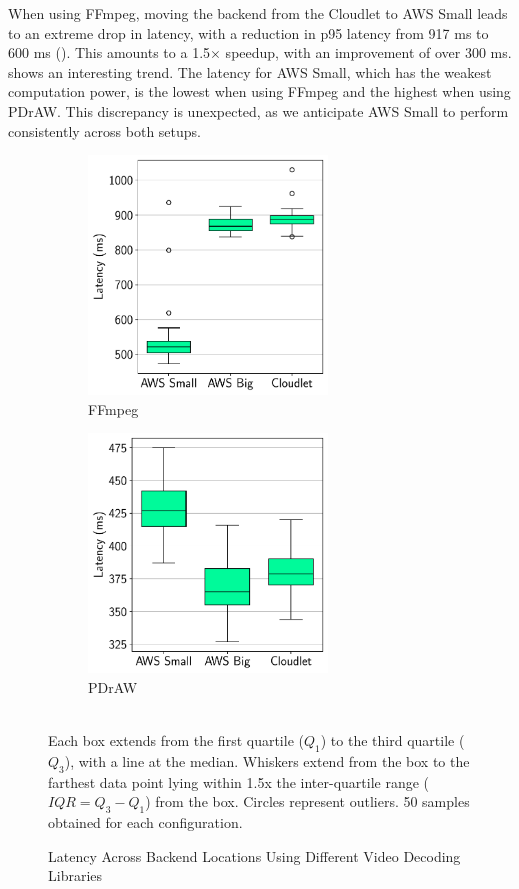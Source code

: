 When using FFmpeg, moving the backend from the Cloudlet to AWS Small leads to
an extreme drop in latency, with a reduction in p95 latency from 917 ms to 600
ms (). This amounts to a 1.5$\times$ speedup,
with an improvement of over 300 ms.  shows an interesting
trend. The latency for AWS Small, which has the weakest computation power, is
the lowest when using FFmpeg and the highest when using PDrAW.  This
discrepancy is unexpected, as we anticipate AWS Small to perform consistently
across both setups.

\begin{figure}[htbp]
    \centering
    \begin{subfigure}[t]{0.45\textwidth}
        \centering
        \includegraphics[height=2.5in]{figs/ffmpeg_box_plot.pdf}
        \caption{FFmpeg}
        \label{fig:ffmpeg_box_plot}
    \end{subfigure}
    \begin{subfigure}[t]{0.45\textwidth}
        \centering
        \includegraphics[height=2.5in]{figs/pdraw_box_plot.pdf}
        \caption{PDrAW}
        \label{fig:pdraw_box_plot}
    \end{subfigure}\vspace{1mm}\\
        \footnotesize{Each box extends from the first quartile ($Q_1$) to the third quartile ($Q_3$), with a line at the median. Whiskers extend from the box to the farthest data point lying within 1.5x the inter-quartile range ($IQR = Q_3-Q_1$) from the box. Circles represent outliers. 50 samples obtained for each configuration.}
    \caption{Latency Across Backend Locations Using Different Video Decoding Libraries}
    \label{fig:box_plots}
\end{figure}

